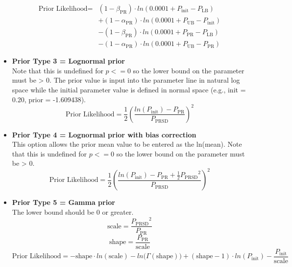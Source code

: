 \begin{itemize}
	\begin{equation}
		\begin{split}
			\text{Prior Likelihood} = & (1 - \beta_\text{PR}) \cdot ln(0.0001 + P_\text{init} - P_\text{LB}) \\
			& + (1 - \alpha_\text{PR}) \cdot ln(0.0001 + P_\text{UB} - P_\text{init}) \\
			& - (1 - \beta_\text{PR}) \cdot ln(0.0001 + P_\text{PR} - P_\text{LB}) \\
			& - (1 - \alpha_\text{PR}) \cdot ln(0.0001 + P_\text{UB} - P_\text{PR})
		\end{split}
	\end{equation}


	
	\item \textbf{Prior Type 3 = Lognormal prior} \\ 
	Note that this is undefined for $p <= 0$ so the lower bound on the parameter must be > 0. The prior value is input into the parameter line in natural log space while the initial parameter value is defined in normal space (e.g., init = 0.20, prior = -1.609438).
	\begin{equation}
		\text{Prior Likelihood} = \frac{1}{2} \left(\frac{ln(P_\text{init})-P_\text{PR}}{P_\text{PRSD}}\right)^2
	\end{equation}
	
	\item \textbf{Prior Type 4 = Lognormal prior with bias correction} \\ 
	This option allows the prior mean value to be entered as the ln(mean). Note that this is undefined for $p <= 0$ so the lower bound on the parameter must be > 0.
	\begin{equation}
		\text{Prior Likelihood} = \frac{1}{2} \left(\frac{ln(P_\text{init})-P_\text{PR} + \frac{1}{2}{P_\text{PRSD}}^2}{P_\text{PRSD}}\right)^2
	\end{equation}
	
	\item \textbf{Prior Type 5 = Gamma prior} \\ 
	The lower bound should be 0 or greater.
	\begin{equation}
		\text{scale} = \frac{{P_\text{PRSD}}^2}{P_\text{PR}}
	\end{equation}
	\begin{equation}
		\text{shape} = \frac{P_\text{PR}}{\text{scale}}
	\end{equation}
	\begin{equation}
		\text{Prior Likelihood} = -\text{shape} \cdot ln(\text{scale}) - ln\big(\Gamma(\text{shape})\big) + (\text{shape} - 1) \cdot ln(P_\text{init}) - \frac{P_\text{init}}{\text{scale}}
	\end{equation}
	

\end{itemize}
